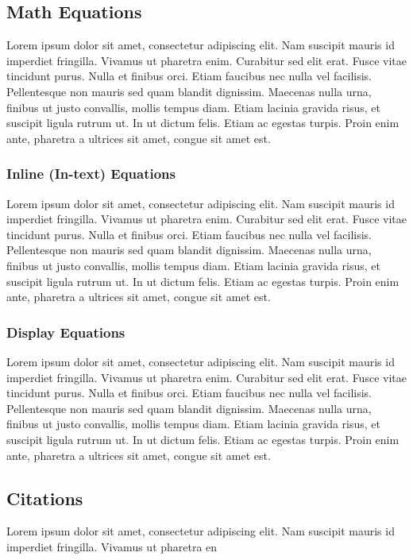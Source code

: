 \subsection{Math Equations}

Lorem ipsum dolor sit amet, consectetur adipiscing elit. Nam suscipit mauris id imperdiet fringilla. Vivamus ut pharetra enim. Curabitur sed elit erat. Fusce vitae tincidunt purus. Nulla et finibus orci. Etiam faucibus nec nulla vel facilisis. Pellentesque non mauris sed quam blandit dignissim. Maecenas nulla urna, finibus ut justo convallis, mollis tempus diam. Etiam lacinia gravida risus, et suscipit ligula rutrum ut. In ut dictum felis. Etiam ac egestas turpis. Proin enim ante, pharetra a ultrices sit amet, congue sit amet est.

\subsubsection{Inline (In-text) Equations}
Lorem ipsum dolor sit amet, consectetur adipiscing elit. Nam suscipit mauris id imperdiet fringilla. Vivamus ut pharetra enim. Curabitur sed elit erat. Fusce vitae tincidunt purus. Nulla et finibus orci. Etiam faucibus nec nulla vel facilisis. Pellentesque non mauris sed quam blandit dignissim. Maecenas nulla urna, finibus ut justo convallis, mollis tempus diam. Etiam lacinia gravida risus, et suscipit ligula rutrum ut. In ut dictum felis. Etiam ac egestas turpis. Proin enim ante, pharetra a ultrices sit amet, congue sit amet est.

\subsubsection{Display Equations}
Lorem ipsum dolor sit amet, consectetur adipiscing elit. Nam suscipit mauris id imperdiet fringilla. Vivamus ut pharetra enim. Curabitur sed elit erat. Fusce vitae tincidunt purus. Nulla et finibus orci. Etiam faucibus nec nulla vel facilisis. Pellentesque non mauris sed quam blandit dignissim. Maecenas nulla urna, finibus ut justo convallis, mollis tempus diam. Etiam lacinia gravida risus, et suscipit ligula rutrum ut. In ut dictum felis. Etiam ac egestas turpis. Proin enim ante, pharetra a ultrices sit amet, congue sit amet est.


\subsection{Citations}
Lorem ipsum dolor sit amet, consectetur adipiscing elit. Nam suscipit mauris id imperdiet fringilla. Vivamus ut pharetra en


